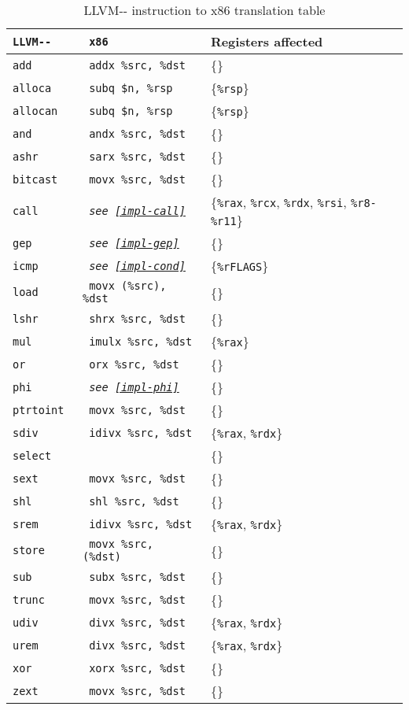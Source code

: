 \documentclass{article}
\begin{document}
\begin{table}[H]
  \centering
\begin{tabular}{|>{\tt}l|>{\tt}l|l|} 
 \hline
 LLVM-{}- & x86 & Registers affected\\
 \hline
add      & addx \%src, \%dst & \{\}\\
alloca   & subq \$n, \%rsp & \{\texttt{\%rsp}\}\\
allocan  & subq \$n, \%rsp & \{\texttt{\%rsp}\}\\
and      & andx \%src, \%dst & \{\}\\
ashr     & sarx \%src, \%dst & \{\}\\
bitcast  & movx \%src, \%dst & \{\}\\
call     & \textrm{\textit{see \ref{impl-call}}} & \{\texttt{\%rax}, \texttt{\%rcx}, \texttt{\%rdx}, \texttt{\%rsi}, \texttt{\%r8-\%r11}\}\\
gep      & \textrm{\textit{see \ref{impl-gep}}} & \{\}\\
icmp     & \textrm{\textit{see \ref{impl-cond}}} & \{\texttt{\%rFLAGS}\}\\
load     & movx (\%src), \%dst & \{\}\\
lshr     & shrx \%src, \%dst & \{\}\\
mul      & imulx \%src, \%dst & \{\texttt{\%rax}\}\\
or       & orx \%src, \%dst & \{\}\\
phi      & \textrm{\textit{see \ref{impl-phi}}} & \{\}\\
ptrtoint & movx \%src, \%dst & \{\}\\
sdiv     & idivx \%src, \%dst & \{\texttt{\%rax}, \texttt{\%rdx}\}\\
select   &  & \{\}\\
sext     & movx \%src, \%dst & \{\}\\
shl      & shl \%src, \%dst & \{\}\\
srem     & idivx \%src, \%dst & \{\texttt{\%rax}, \texttt{\%rdx}\}\\
store    & movx \%src, (\%dst) & \{\}\\
sub      & subx \%src, \%dst & \{\}\\
trunc    & movx \%src, \%dst & \{\}\\
udiv     & divx \%src, \%dst & \{\texttt{\%rax}, \texttt{\%rdx}\}\\
urem     & divx \%src, \%dst & \{\texttt{\%rax}, \texttt{\%rdx}\}\\
xor      & xorx \%src, \%dst & \{\}\\
zext     & movx \%src, \%dst & \{\}\\
 \hline
\end{tabular}
\caption{LLVM-{}- instruction to x86 translation table}\label{tab:trans}
\end{table}
\end{document}
